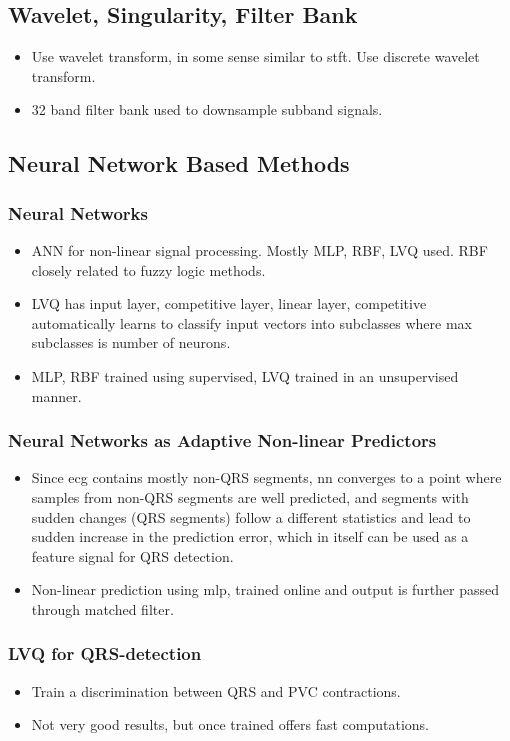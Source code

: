 \documentclass{article}
\begin{document}
\subsection{Wavelet, Singularity, Filter Bank}
\begin{itemize}
\item Use wavelet transform, in some sense similar to stft. Use discrete wavelet transform.
\item 32 band filter bank used to downsample subband signals.
\end{itemize}

\subsection{Neural Network Based Methods}
\subsubsection{Neural Networks}
\begin{itemize}
\item ANN for non-linear signal processing. Mostly MLP, RBF, LVQ used. RBF closely related to fuzzy logic methods.
\item LVQ has input layer, competitive layer, linear layer, competitive automatically learns to classify input vectors into subclasses where max subclasses is number of neurons.
\item MLP, RBF trained using supervised, LVQ trained in an unsupervised manner.
\end{itemize}
\subsubsection{Neural Networks as Adaptive Non-linear Predictors}
\begin{itemize}
\item Since ecg contains mostly non-QRS segments, nn converges to a point where samples from non-QRS segments are well predicted, and segments with sudden changes (QRS segments) follow a different statistics and lead to sudden increase in the prediction error, which in itself can be used as a feature signal for QRS detection.
\item Non-linear prediction using mlp, trained online and output is further passed through matched filter.
\end{itemize}
\subsubsection{LVQ for QRS-detection}
\begin{itemize}
\item Train a discrimination between QRS and PVC contractions.
\item Not very good results, but once trained offers fast computations.
\end{itemize}
\end{document}
